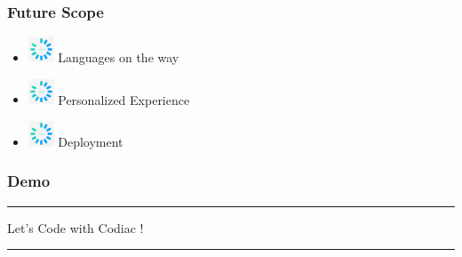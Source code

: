 \documentclass[14pt]{beamer}
\begin{document}
\begin{frame}
    \frametitle{Future Scope}
	\noindent                                                                                                       {\color{pink} \rule{\linewidth}{0.7mm}} 
         \begin{itemize}
 \item [] \includegraphics[width=0.3in, height=0.3in]{./Codiac/logos/loading.jpg} Languages on the way\\
     \pause
 \item [] \includegraphics[width=0.3in, height=0.3in]{./Codiac/logos/loading.jpg} Personalized Experience \\
     \pause
 \item [] \includegraphics[width=0.3in, height=0.3in]{./Codiac/logos/loading.jpg} Deployment\\
 \end{itemize}
\noindent{	
	   \color{pink} \rule{\linewidth}{0.7mm} }   	
\end{frame}	


\begin{frame}
	\frametitle{Demo}
    {\color{dr} \rule{\linewidth}{0.7mm}}
    \linebreak
    \linebreak
    \centerline
    {\huge \color{dr}
    Let's Code with Codiac !}
    \linebreak

    {\color{dr} \rule{\linewidth}{0.7mm}}
\end{frame}
\end{document}
